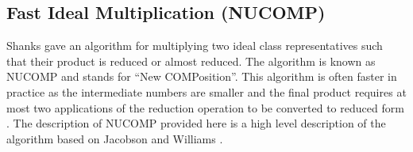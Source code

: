 \documentclass{ucalgthes1}
\theoremstyle{definition}
\begin{document}
\subsection{Fast Ideal Multiplication (NUCOMP)}
\label{subsec:nucomp}

Shanks \cite{Shanks1989} gave an algorithm for multiplying two ideal class representatives such that their product is reduced or almost reduced.  The algorithm is known as NUCOMP and stands for ``New COMPosition''.  This algorithm is often faster in practice as the intermediate numbers are smaller and the final product requires at most two applications of the reduction operation to be converted to reduced form \cite[pp.439--441]{Jacobson2009}. The description of NUCOMP provided here is a high level description of the algorithm based on Jacobson and Williams \mbox{\cite[\S 5.4,~pp. 119-123]{Jacobson2009}}.
\end{document}
